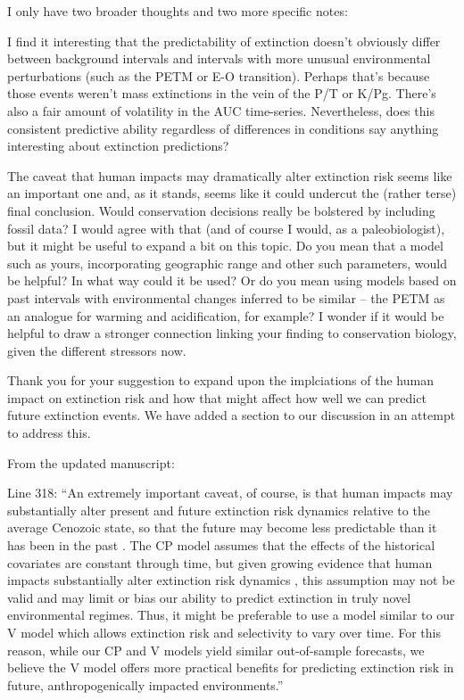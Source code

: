 \documentclass[12pt,letterpaper]{article}
\begin{document}
\begin{refsection}
\begin{bfseries}
  I only have two broader thoughts and two more specific notes:

  I find it interesting that the predictability of extinction doesn’t obviously differ between background intervals and intervals with more unusual environmental perturbations (such as the PETM or E-O transition). Perhaps that’s because those events weren’t mass extinctions in the vein of the P/T or K/Pg. There’s also a fair amount of volatility in the AUC time-series. Nevertheless, does this consistent predictive ability regardless of differences in conditions say anything interesting about extinction predictions?

  The caveat that human impacts may dramatically alter extinction risk seems like an important one and, as it stands, seems like it could undercut the (rather terse) final conclusion. Would conservation decisions really be bolstered by including fossil data? I would agree with that (and of course I would, as a paleobiologist), but it might be useful to expand a bit on this topic. Do you mean that a model such as yours, incorporating geographic range and other such parameters, would be helpful? In what way could it be used? Or do you mean using models based on past intervals with environmental changes inferred to be similar – the PETM as an analogue for warming and acidification, for example? I wonder if it would be helpful to draw a stronger connection linking your finding to conservation biology, given the different stressors now.
\end{bfseries}

Thank you for your suggestion to expand upon the implciations of the human impact on extinction risk and how that might affect how well we can predict future extinction events. We have added a section to our discussion in an attempt to address this.

From the updated manuscript:

Line 318: ``An extremely important caveat, of course, is that human impacts may substantially alter present and future extinction risk dynamics relative to the average Cenozoic state, so that the future may become less predictable than it has been in the past \citep{Harnik2012a,Finnegan2015}. The CP model assumes that the effects of the historical covariates are constant through time, but given growing evidence that human impacts substantially alter extinction risk dynamics \citep{Harnik2012a,Finnegan2015,Payne2007}, this assumption may not be valid and may limit or bias our ability to predict extinction in truly novel environmental regimes. Thus, it might be preferable to use a model similar to our V model which allows extinction risk and selectivity to vary over time. For this reason, while our CP and V models yield similar out-of-sample forecasts, we believe the V model offers more practical benefits for predicting extinction risk in future, anthropogenically impacted environments.''


\end{refsection}
\end{document}

